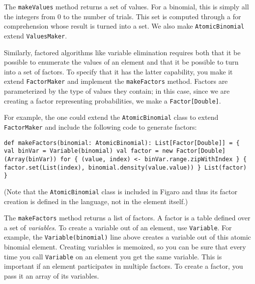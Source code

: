 The \texttt{makeValues} method returns a set of values. For a binomial, this is simply all the integers from
0 to the number of trials. This set is computed through a for comprehension whose result is turned into a set. We also make \texttt{AtomicBinomial} extend \texttt{ValuesMaker}.

Similarly, factored algorithms like variable elimination requires both that it be possible to enumerate the values of an element and that it be possible to turn into a set of factors. To specify that it has the latter capability, you make it
extend \texttt{FactorMaker} and implement the \texttt{makeFactors} method. Factors are parameterized by the type of values they contain; in this case, since we are creating a factor representing probabilities, we make a \texttt{Factor[Double]}.

For example, the one could extend the \texttt{AtomicBinomial} class to extend \texttt{FactorMaker} and include the following code to generate factors:

\begin{flushleft}
\texttt{def makeFactors(binomial: AtomicBinomial): List[Factor[Double]] = \{
\newline \tab val binVar = Variable(binomial)
\newline \tab val factor = new Factor[Double](Array(binVar))
\newline \tab for \{ (value, index) <- binVar.range.zipWithIndex \} \{
\newline \tab factor.set(List(index), binomial.density(value.value))
\newline \} 
\newline \tab List(factor)
\newline \}
}
\end{flushleft}
(Note that the \texttt{AtomicBinomial} class is included in Figaro and thus its factor creation is defined in the language, not in the element itself.)

The \texttt{makeFactors} method returns a list of factors. A factor is a table defined over a set of \emph{variables}. To create a variable out of an element, use \texttt{Variable}. For example, the \texttt{Variable(binomial)} line above creates a variable out of this atomic binomial element. Creating variables is memoized, so you can be sure that every time you call \texttt{Variable} on an element you get the same variable. This is important if an element participates in multiple factors. To create a factor, you pass it an array of its variables.


